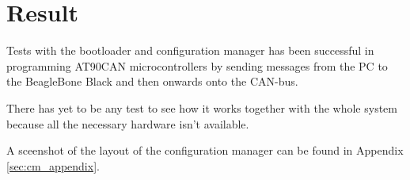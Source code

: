 \section{Result}\label{sec:result}
Tests with the bootloader and configuration manager has been successful in programming AT90CAN microcontrollers by sending messages from the PC to the BeagleBone Black and then onwards onto the CAN-bus.

There has yet to be any test to see how it works together with the whole system because all the necessary hardware isn't available.

A sceenshot of the layout of the configuration manager can be found in Appendix \ref{sec:cm_appendix}.


%
%

